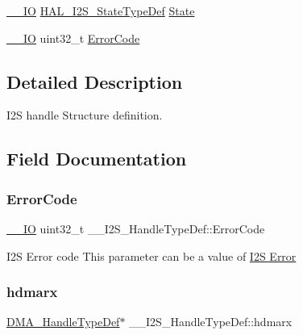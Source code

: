 \begin{DoxyCompactItemize}
\item 
\hyperlink{core__sc300_8h_aec43007d9998a0a0e01faede4133d6be}{\+\_\+\+\_\+\+IO} \hyperlink{group___i2_s___exported___types_ga2588a0c71baf7cd6d2c1b9b11120bef0}{H\+A\+L\+\_\+\+I2\+S\+\_\+\+State\+Type\+Def} \hyperlink{struct_____i2_s___handle_type_def_aee7a449f3c7fab6129898b32e0f29c0c}{State}
\item 
\hyperlink{core__sc300_8h_aec43007d9998a0a0e01faede4133d6be}{\+\_\+\+\_\+\+IO} uint32\+\_\+t \hyperlink{struct_____i2_s___handle_type_def_a5b4a8a5764e8cd8764b0c1c5ee495cd0}{Error\+Code}
\end{DoxyCompactItemize}


\subsection{Detailed Description}
I2S handle Structure definition. 

\subsection{Field Documentation}
\mbox{\label{struct_____i2_s___handle_type_def_a5b4a8a5764e8cd8764b0c1c5ee495cd0}} 
\subsubsection{\texorpdfstring{Error\+Code}{ErrorCode}}
{\footnotesize\ttfamily \hyperlink{core__sc300_8h_aec43007d9998a0a0e01faede4133d6be}{\+\_\+\+\_\+\+IO} uint32\+\_\+t \+\_\+\+\_\+\+I2\+S\+\_\+\+Handle\+Type\+Def\+::\+Error\+Code}

I2S Error code This parameter can be a value of \hyperlink{group___i2_s___error}{I2S Error} \mbox{\label{struct_____i2_s___handle_type_def_a3ff52b81753a72aec6ddaeae0f96fba6}} 
\subsubsection{\texorpdfstring{hdmarx}{hdmarx}}
{\footnotesize\ttfamily \hyperlink{group___d_m_a___exported___types_ga41b754a906b86bce54dc79938970138b}{D\+M\+A\+\_\+\+Handle\+Type\+Def}$\ast$ \+\_\+\+\_\+\+I2\+S\+\_\+\+Handle\+Type\+Def\+::hdmarx}

